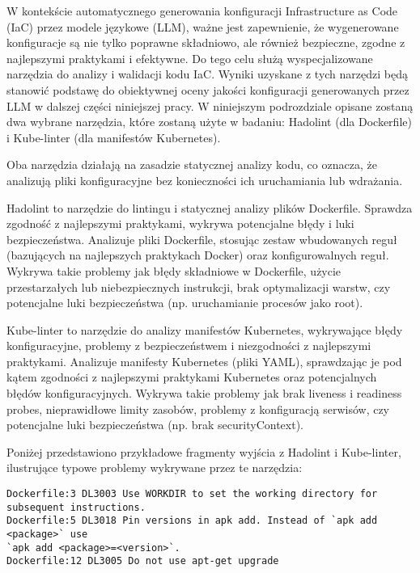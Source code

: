W kontekście automatycznego generowania konfiguracji Infrastructure as Code (IaC) przez modele językowe (LLM), ważne jest zapewnienie, że wygenerowane konfiguracje są nie tylko poprawne składniowo, ale również bezpieczne, zgodne z najlepszymi praktykami i efektywne. Do tego celu służą wyspecjalizowane narzędzia do analizy i walidacji kodu IaC. Wyniki uzyskane z tych narzędzi będą stanowić podstawę do obiektywnej oceny jakości konfiguracji generowanych przez LLM w dalszej części niniejszej pracy. W niniejszym podrozdziale opisane zostaną dwa wybrane narzędzia, które zostaną użyte w badaniu: Hadolint (dla Dockerfile) i Kube-linter (dla manifestów Kubernetes).

Oba narzędzia działają na zasadzie statycznej analizy kodu, co oznacza, że analizują pliki konfiguracyjne bez konieczności ich uruchamiania lub wdrażania.

Hadolint to narzędzie do lintingu i statycznej analizy plików Dockerfile. Sprawdza zgodność z najlepszymi praktykami, wykrywa potencjalne błędy i luki bezpieczeństwa. Analizuje pliki Dockerfile, stosując zestaw wbudowanych reguł (bazujących na najlepszych praktykach Docker) oraz konfigurowalnych reguł. Wykrywa takie problemy jak błędy składniowe w Dockerfile, użycie przestarzałych lub niebezpiecznych instrukcji, brak optymalizacji warstw, czy potencjalne luki bezpieczeństwa (np. uruchamianie procesów jako root).

Kube-linter to narzędzie do analizy manifestów Kubernetes, wykrywające błędy konfiguracyjne, problemy z bezpieczeństwem i niezgodności z najlepszymi praktykami. Analizuje manifesty Kubernetes (pliki YAML), sprawdzając je pod kątem zgodności z najlepszymi praktykami Kubernetes oraz potencjalnych błędów konfiguracyjnych. Wykrywa takie problemy jak brak liveness i readiness probes, nieprawidłowe limity zasobów, problemy z konfiguracją serwisów, czy potencjalne luki bezpieczeństwa (np. brak securityContext).

Poniżej przedstawiono przykładowe fragmenty wyjścia z Hadolint i Kube-linter, ilustrujące typowe problemy wykrywane przez te narzędzia:

\begin{lstlisting}[caption={Przykład wyników Hadolint},label={lst:example-hadolint},captionpos=b,columns=fullflexible, breaklines=true]
Dockerfile:3 DL3003 Use WORKDIR to set the working directory for subsequent instructions.
Dockerfile:5 DL3018 Pin versions in apk add. Instead of `apk add <package>` use
`apk add <package>=<version>`.
Dockerfile:12 DL3005 Do not use apt-get upgrade
\end{lstlisting}

